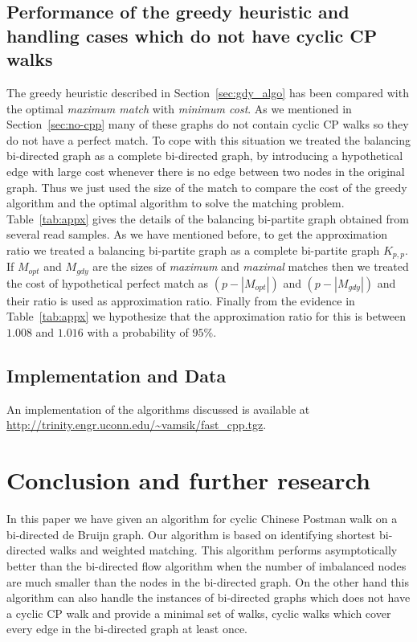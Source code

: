 \documentclass[runningheads]{llncs}
\begin{document}
\subsection{Performance of the greedy heuristic and handling cases which do not have cyclic CP walks}
\label{sec:gdy_heuristic}
The greedy heuristic described in Section~\ref{sec:gdy_algo} has been compared with the optimal
{\em maximum match} with {\em minimum cost}. As we mentioned in Section~\ref{sec:no-cpp} many 
of these graphs do not contain cyclic CP walks so they do not have a perfect match. To cope with
this situation we treated the balancing bi-directed graph as a complete bi-directed graph, by
introducing a hypothetical edge with large cost whenever there is no edge between two nodes
in the original graph. Thus we just used the size of the match to compare the cost of the greedy
algorithm and the optimal algorithm to solve the matching problem. Table~\ref{tab:appx} gives
the details of the balancing bi-partite graph obtained from several read samples. As we have
mentioned before, to get the approximation ratio we treated a balancing bi-partite graph as a complete
bi-partite graph $K_{p,p}$. If $M_{opt}$ and $M_{gdy}$ are the sizes of {\em maximum} and {\em maximal}
matches then we treated the cost of hypothetical perfect match as $(p-|M_{opt}|)$ and $(p-|M_{gdy}|)$
and their ratio is used as approximation ratio. Finally from the evidence in Table~\ref{tab:appx}
we hypothesize that the approximation ratio for this is between $1.008$ and $1.016$ with a probability
of $95\%$.

\subsection{Implementation and Data}
An implementation of the algorithms discussed is available at \url{http://trinity.engr.uconn.edu/~vamsik/fast_cpp.tgz}.

\section{Conclusion and further research}
In this paper we have given an algorithm for cyclic Chinese Postman walk on a bi-directed de Bruijn graph. Our
algorithm is based on identifying shortest bi-directed walks and weighted matching. This algorithm performs
asymptotically better than the bi-directed flow algorithm when the number of imbalanced nodes are much smaller
than the nodes in the bi-directed graph. On the other hand this algorithm can also handle the instances of
bi-directed graphs which does not have a cyclic CP walk and provide a minimal set of walks, cyclic walks
which cover every edge in the bi-directed graph at least once. 
\end{document}
